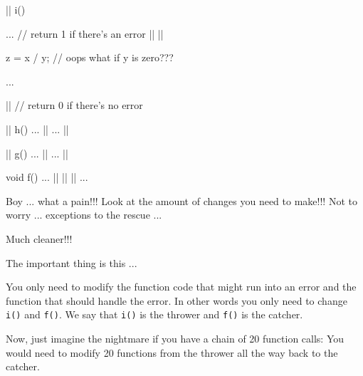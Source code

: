 \begin{consolethree}[escapeinside=||]%
|| i()
{    
     ...
     // return 1 if there's an error
     ||
         ||

     z = x / y; // oops what if y is zero???

     ...

  ||  // return 0 if there's no error
}

|| h()
{    
     ...
     ||
     ...
     ||
}

|| g()
{    
     ...
     ||
     ...
  ||
}

void f()
{
     ...
     ||
     {
        ||
        ||
     }
     ...
}
\end{consolethree}

Boy ... what a pain!!! Look at the amount of changes you need to make!!!
Not to worry ... exceptions to the rescue ...


Much cleaner!!!

The important thing is this ...

You only need to modify the function code that might run into an error
and the function that should handle the error. In other words you only
need to change \texttt{i()} and \texttt{f()}. We say that \texttt{i()} is the
thrower and \texttt{f()} is the catcher.

Now, just imagine the nightmare if you have a chain of 20 function
calls: You would need to modify 20 functions from the thrower all the
way back to the catcher.

